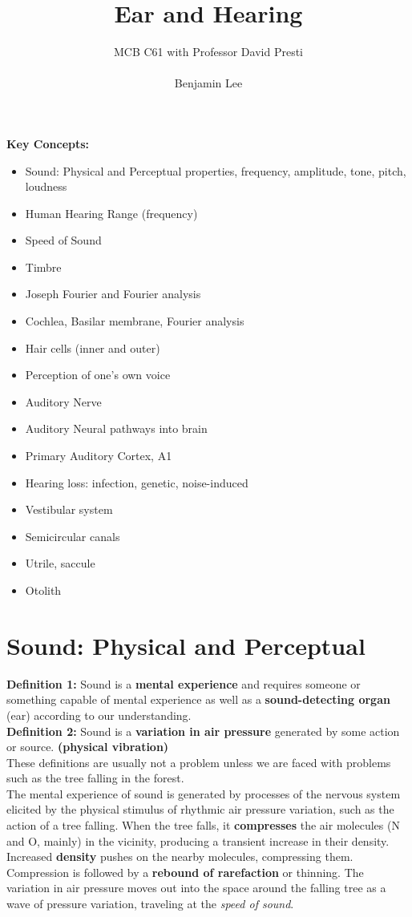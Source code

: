 \documentclass{article}
\title{Ear and Hearing}
\author{MCB C61 with Professor David Presti \\ \\ Benjamin Lee}
\begin{document}
\maketitle


\textbf{Key Concepts:} 
\begin{itemize}
    \item Sound: Physical and Perceptual properties, frequency, amplitude, tone, pitch, loudness
    \item Human Hearing Range (frequency)
    \item Speed of Sound 
    \item Timbre
    \item Joseph Fourier and Fourier analysis 
    \item Cochlea, Basilar membrane, Fourier analysis
    \item Hair cells (inner and outer)
    \item Perception of one's own voice 
    \item Auditory Nerve
    \item Auditory Neural pathways into brain
    \item Primary Auditory Cortex, A1
    \item Hearing loss: infection, genetic, noise-induced
    \item Vestibular system
    \item Semicircular canals
    \item Utrile, saccule
    \item Otolith
\end{itemize}

\newpage
\section{Sound: Physical and Perceptual}
\textbf{Definition 1:} Sound is a \textbf{mental experience} and requires someone or something capable of mental experience as well as a \textbf{sound-detecting organ} (ear) according to our understanding. \\
\textbf{Definition 2:} Sound is a \textbf{variation in air pressure} generated by some action or source. \textbf{(physical vibration)} \\

These definitions are usually not a problem unless we are faced with problems such as the tree falling in the forest. \\

The mental experience of sound is generated by processes of the nervous system elicited by the physical stimulus of rhythmic air pressure variation, such as the action of a tree falling. When the tree falls, it \textbf{compresses} the air molecules (N and O, mainly) in the vicinity, producing a transient increase in their density. Increased \textbf{density} pushes on the nearby molecules, compressing them. Compression is followed by a \textbf{rebound of rarefaction} or thinning. The variation in air pressure moves out into the space around the falling tree as a wave of pressure variation, traveling at the \textit{speed of sound}. \\
\end{document}
